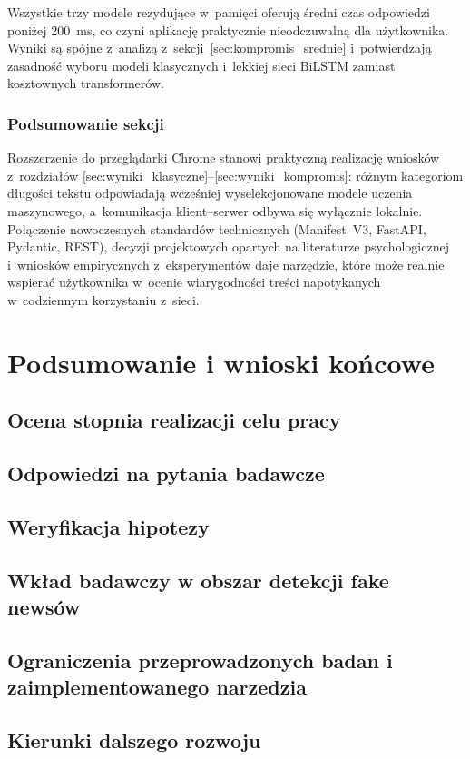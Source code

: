 \documentclass[oneside,polski,logo]{amuthesis}
\begin{document}
Wszystkie trzy modele rezydujące w~pamięci oferują średni czas
odpowiedzi poniżej 200~ms, co czyni aplikację praktycznie
nieodczuwalną dla użytkownika. Wyniki są spójne z~analizą z~sekcji~\ref{sec:kompromis_srednie}
i~potwierdzają zasadność wyboru modeli klasycznych i~lekkiej sieci
BiLSTM zamiast kosztownych transformerów.

\subsection*{Podsumowanie sekcji}

Rozszerzenie do przeglądarki Chrome stanowi praktyczną realizację
wniosków z~rozdziałów \ref{sec:wyniki_klasyczne}--\ref{sec:wyniki_kompromis}:
różnym kategoriom długości tekstu odpowiadają wcześniej wyselekcjonowane
modele uczenia maszynowego, a~komunikacja klient--serwer odbywa się
wyłącznie lokalnie. Połączenie nowoczesnych standardów technicznych
(Manifest~V3, FastAPI, Pydantic, REST), decyzji projektowych
opartych na literaturze psychologicznej~\cite{pennycook2021psychology,
pennycook2020implied} i~wniosków empirycznych z~eksperymentów daje
narzędzie, które może realnie wspierać użytkownika w~ocenie wiarygodności
treści napotykanych w~codziennym korzystaniu z~sieci.

\chapter{Podsumowanie i wnioski końcowe}

\section{Ocena stopnia realizacji celu pracy}

\section{Odpowiedzi na pytania badawcze}

\section{Weryfikacja hipotezy}

\section{Wkład badawczy w obszar detekcji fake newsów}

\section{Ograniczenia przeprowadzonych badan i zaimplementowanego narzedzia}

\section{Kierunki dalszego rozwoju}

\printbibliography
\end{document}
